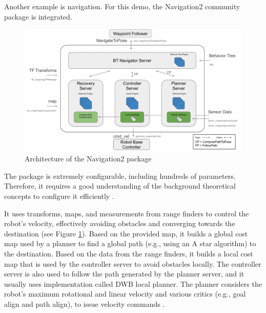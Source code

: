 Another example is navigation.
For this demo, the Navigation2 community package is integrated.  
\begin{figure}[H]
    \centering
    \includegraphics[width=\textwidth]{demos/figures/navigation_overview.png}
    \caption[Architecture of the Navigation2 package]{Architecture of the Navigation2 package\footnotemark}
    \label{fig:demos:navigation_overview}
\end{figure}

The package is extremely configurable, including hundreds of parameters.
Therefore, it requires a good understanding of the background theoretical concepts to configure it efficiently \cite{zheng_ros_nodate}.

It uses transforms, maps, and measurements from range finders to control the robot's velocity, effectively avoiding obstacles and converging towards the destination (see Figure \ref{fig:demos:navigation_overview}).
Based on the provided map, it builds a global cost map used by a planner to find a global path (e.g., using an A star algorithm) to the destination.
Based on the data from the range finders, it builds a local cost map that is used by the controller server to avoid obstacles locally.
The controller server is also used to follow the path generated by the planner server, and it usually uses implementation called DWB local planner.
The planner considers the robot's maximum rotational and linear velocity and various critics (e.g., goal align and path align), to issue velocity commands \cite{macenski_marathon_2020-1}. 

